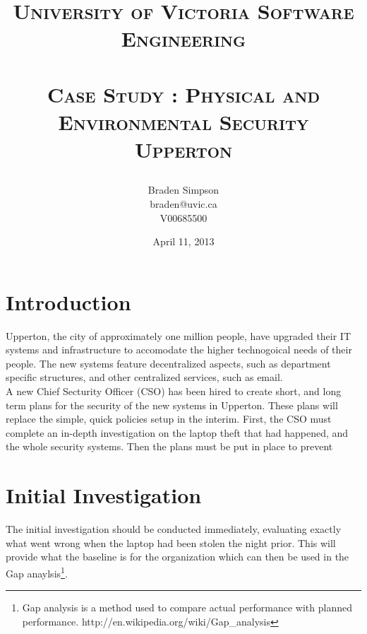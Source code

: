 \documentclass{article}
\title{
\large{\textsc{University of Victoria Software Engineering}}\huge\\ [0pt] %
\horrule{0.5pt}\\[0.4cm]
\textsc{Case Study : Physical and Environmental Security\\Upperton}\\
\author{Braden Simpson\\braden@uvic.ca\\V00685500}
\date{April 11, 2013}
}
\numberwithin{equation}{section} %
\numberwithin{figure}{section} %
\numberwithin{table}{section} %
\begin{document}
\maketitle %


\section{Introduction}
Upperton, the city of approximately one million people, have upgraded their IT systems and infrastructure to accomodate the higher technogoical needs of their people.  The new systems feature decentralized aspects, such as department specific structures, and other centralized services, such as email.\\

A new Chief Secturity Officer (CSO) has been hired to create short, and long term plans for the security of the new systems in Upperton.  These plans will replace the simple, quick policies setup in the interim.  First, the CSO must complete an in-depth investigation on the laptop theft that had happened, and the whole security systems.  Then the plans must be put in place to prevent   

\section{Initial Investigation}
\label{sec:invest}
The initial investigation should be conducted immediately, evaluating exactly what went wrong when the laptop had been stolen the night prior.  This will provide what the baseline is for the organization which can then be used in the Gap anaylsis\footnote{Gap analysis is a method used to compare actual performance with planned performance.  http://en.wikipedia.org/wiki/Gap\_analysis}.\\

\newpage
\end{document}
